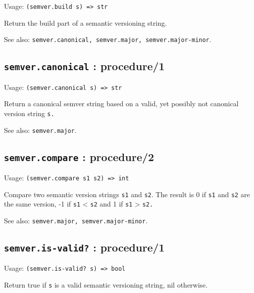 \documentclass[
]{article}
\newcommand{\passthrough}[1]{#1}
\begin{document}
Usage: \passthrough{\lstinline!(semver.build s) => str!}

Return the build part of a semantic versioning string.

See also:
\passthrough{\lstinline!semver.canonical, semver.major, semver.major-minor!}.

\hypertarget{semver.canonical-procedure1-1}{%
\subsection{\texorpdfstring{\texttt{semver.canonical} :
procedure/1}{semver.canonical : procedure/1}}\label{semver.canonical-procedure1-1}}

Usage: \passthrough{\lstinline!(semver.canonical s) => str!}

Return a canonical semver string based on a valid, yet possibly not
canonical version string \passthrough{\lstinline!s.!}

See also: \passthrough{\lstinline!semver.major!}.

\hypertarget{semver.compare-procedure2-1}{%
\subsection{\texorpdfstring{\texttt{semver.compare} :
procedure/2}{semver.compare : procedure/2}}\label{semver.compare-procedure2-1}}

Usage: \passthrough{\lstinline!(semver.compare s1 s2) => int!}

Compare two semantic version strings \passthrough{\lstinline!s1!} and
\passthrough{\lstinline!s2!}. The result is 0 if
\passthrough{\lstinline!s1!} and \passthrough{\lstinline!s2!} are the
same version, -1 if \passthrough{\lstinline!s1!} \textless{}
\passthrough{\lstinline!s2!} and 1 if \passthrough{\lstinline!s1!}
\textgreater{} \passthrough{\lstinline!s2.!}

See also: \passthrough{\lstinline!semver.major, semver.major-minor!}.

\hypertarget{semver.is-valid-procedure1-1}{%
\subsection{\texorpdfstring{\texttt{semver.is-valid?} :
procedure/1}{semver.is-valid? : procedure/1}}\label{semver.is-valid-procedure1-1}}

Usage: \passthrough{\lstinline!(semver.is-valid? s) => bool!}

Return true if \passthrough{\lstinline!s!} is a valid semantic
versioning string, nil otherwise.
\end{document}

